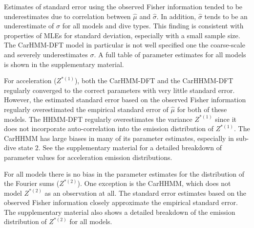 Estimates of standard error using the observed Fisher information tended to be underestimates due to correlation between $\hat \mu$ and $\hat \sigma$. In addition, $\hat \sigma$ tends to be an underestimate of $\sigma$ for all models and dive types. This finding is consistent with properties of MLEs for standard deviation, especially with a small sample size. The CarHMM-DFT model in particular is not well specified one the coarse-scale and severely underestimates $\sigma$. %
A full table of parameter estimates for all models is shown in the supplementary material.


For acceleration ($Z^{*(1)}$), both the CarHMM-DFT and the CarHHMM-DFT regularly converged to the correct parameters with very little standard error. However, the estimated standard error based on the observed Fisher information regularly overestimated the empirical standard error of $\hat \mu$ for both of these models. 
The HHMM-DFT regularly overestimates the variance $Z^{*(1)}$ since it does not incorporate auto-correlation into the emission distribution of $Z^{*(1)}$. The CarHHMM has large biases in many of its parameter estimates, especially in sub-dive state 2. 
See the supplementary material for a detailed breakdown of parameter values for acceleration emission distributions.

For all models there is no bias in the parameter estimates for the distribution of the Fourier sums ($Z^{*(2)}$). One exception is the CarHHMM, which does not model $Z^{*(2)}$ as an observation at all. The standard error estimates based on the observed Fisher information closely approximate the empirical standard error.
The supplementary material also shows a detailed breakdown of the emission distribution of $Z^{*(2)}$ for all models.

